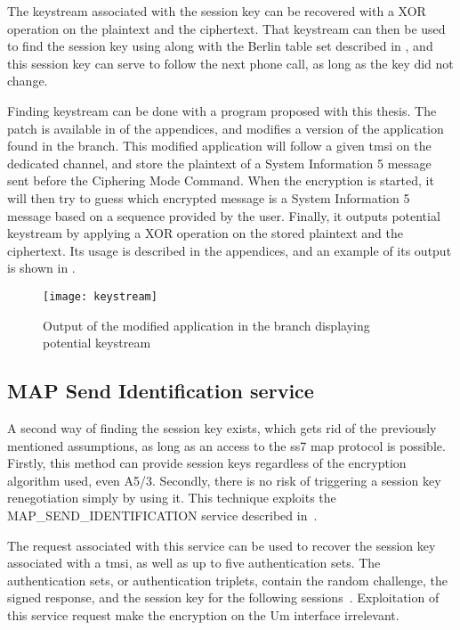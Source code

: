       The keystream associated with the session key can be recovered
      with a XOR operation on the plaintext and the ciphertext. That
      keystream can then be used to find the session key using
       along with the Berlin table set described in
      , and this session key can serve to follow the
      next phone call, as long as the key did not change.

      Finding keystream can be done with a program proposed with this
      thesis. The patch is available in  of the
      appendices, and modifies a version of the 
      application found in the  branch. This
      modified application will follow a given \gls{tmsi} on the
      dedicated channel, and store the plaintext of a System Information
      5 message sent before the Ciphering Mode Command. When the
      encryption is started, it will then try to guess which encrypted
      message is a System Information 5 message based on a sequence
      provided by the user. Finally, it outputs potential keystream by
      applying a XOR operation on the stored plaintext and the
      ciphertext. Its usage is described in the appendices, and an
      example of its output is shown in .

        \begin{figure}[h]
          \centering
          \texttt{[image: keystream]}
          \caption{Output of the modified  application
          in the  branch displaying potential
        keystream}
          \label{fig:keystream}
        \end{figure}

      \subsection{MAP Send Identification service}

        A second way of finding the session key exists, which gets rid of
        the previously mentioned assumptions, as long as an access to
        the \gls{ss7} \gls{map} protocol is possible. Firstly, this
        method can provide session keys regardless of the encryption
        algorithm used, even A5/3. Secondly, there is no risk of
        triggering a session key renegotiation simply by using it. This
        technique exploits the MAP\_SEND\_IDENTIFICATION service described
        in~.

        The request associated with this service can be used to recover
        the session key associated with a \gls{tmsi}, as well as up to
        five authentication sets. The authentication sets, or
        authentication triplets, contain the random challenge, the
        signed response, and the session key for the following
        sessions~\cite[p.~100]{3gpp_ts_2015-1}. Exploitation of this
        service request make the encryption on the Um interface
        irrelevant.

